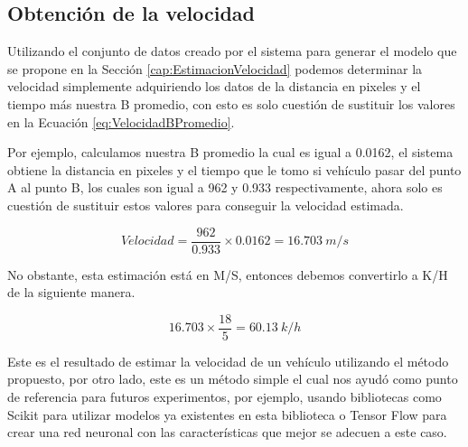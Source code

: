 \subsection{Obtención de la velocidad}

Utilizando el conjunto de datos creado por el sistema para generar el modelo que se propone en la Sección \ref{cap:EstimacionVelocidad} podemos determinar la velocidad simplemente adquiriendo los datos de la distancia en pixeles y el tiempo más nuestra B promedio, con esto es solo cuestión de sustituir los valores en la Ecuación \ref{eq:VelocidadBPromedio}.

Por ejemplo, calculamos nuestra B promedio la cual es igual a 0.0162, el sistema obtiene la distancia en pixeles y el tiempo que le tomo si vehículo pasar del punto A al punto B, los cuales son igual a 962 y 0.933 respectivamente, ahora solo es cuestión de sustituir estos valores para conseguir la velocidad estimada.

\begin{equation}
    \label{eq:EjemploImplementacion}
    Velocidad = \frac{962 }{0.933} \times 0.0162 = 16.703 \: m/s
\end{equation}


No obstante, esta estimación está en M/S, entonces debemos convertirlo a K/H de la siguiente manera.

\begin{equation}
    \label{eq:EjmploKH}
     16.703\times \frac{18}{5} = 60.13 \: k/h
\end{equation}

Este es el resultado de estimar la velocidad de un vehículo utilizando el método propuesto, por otro lado, este es un método simple el cual nos ayudó como punto de referencia para futuros experimentos, por ejemplo, usando bibliotecas como Scikit para utilizar modelos ya existentes en esta biblioteca o Tensor Flow para crear una red neuronal con las características que mejor se adecuen a este caso.
